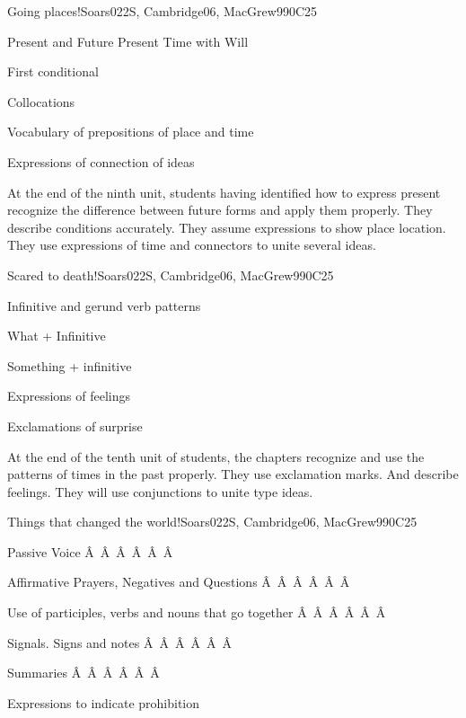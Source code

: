 \begin{syllabus}
\begin{unit}{Going places!}{}{Soars022S, Cambridge06, MacGrew99}{0}{C25}
   \begin{topics}
      \item Present and Future Present Time with Will
      \item First conditional
      \item Collocations
      \item Vocabulary of prepositions of place and time
      \item Expressions of connection of ideas
   \end{topics}

   \begin{learningoutcomes}
      \item At the end of the ninth unit, students having identified how to express present recognize the difference between future forms and apply them properly. They describe conditions accurately. They assume expressions to show place location. They use expressions of time and connectors to unite several ideas.
   \end{learningoutcomes}
\end{unit}

\begin{unit}{Scared to death!}{}{Soars022S, Cambridge06, MacGrew99}{0}{C25}
   \begin{topics}
      \item Infinitive and gerund verb patterns
      \item What + Infinitive
      \item Something + infinitive
      \item Expressions of feelings
      \item Exclamations of surprise
   \end{topics}

   \begin{learningoutcomes}
      \item At the end of the tenth unit of students, the chapters recognize and use the patterns of times in the past properly. They use exclamation marks. And describe feelings. They will use conjunctions to unite type ideas.
   \end{learningoutcomes}
\end{unit}

\begin{unit}{Things that changed the world!}{}{Soars022S, Cambridge06, MacGrew99}{0}{C25}
   \begin{topics}
       \item Passive Voice
Â Â Â Â Â Â  \item Affirmative Prayers, Negatives and Questions
Â Â Â Â Â Â  \item Use of participles, verbs and nouns that go together
Â Â Â Â Â Â  \item Signals. Signs and notes
Â Â Â Â Â Â  \item Summaries
Â Â Â Â Â Â  \item Expressions to indicate prohibition
    \end{topics}


\end{unit}
\end{syllabus}
